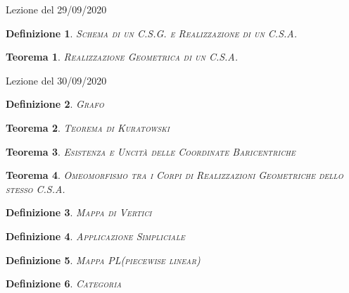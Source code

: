 \documentclass{article}
\newtheorem{defn}{Definizione}[section]
\newtheorem{thm}{Teorema}[section]
\begin{document}
  \begin{section}{Lezione del 29/09/2020}
    \begin{defn}{\scshape Schema di un C.S.G. e Realizzazione di un C.S.A.\\}
    \end{defn}
    \begin{thm}{\scshape Realizzazione Geometrica di un C.S.A.\\}
    \end{thm}
  \end{section}
  \begin{section}{Lezione del 30/09/2020}
    \begin{defn}{\scshape Grafo \\}
    \end{defn}
    \begin{thm}{\scshape Teorema di Kuratowski\\}
    \end{thm}
    \begin{thm}{\scshape Esistenza e Uncità delle Coordinate Baricentriche\\}
    \end{thm}
    \begin{thm}{\scshape Omeomorfismo tra i Corpi di Realizzazioni Geometriche dello stesso C.S.A.\\}
    \end{thm}
    \begin{defn}{\scshape Mappa di Vertici\\}
    \end{defn}
    \begin{defn}{\scshape Applicazione Simpliciale\\}
    \end{defn}
    \begin{defn}{\scshape Mappa PL(piecewise linear)\\}
    \end{defn}
    \begin{defn}{\scshape Categoria\\}
    \end{defn}
  \end{section}
\end{document}
